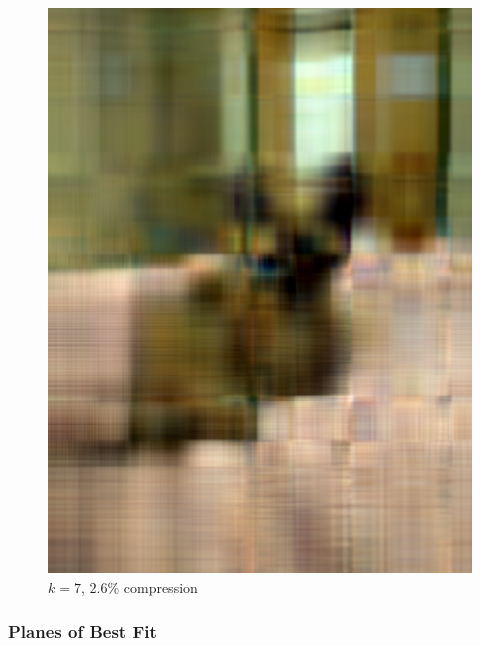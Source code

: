 \begin{figure}[H]
\begin{minipage}[b]{0.4\textwidth}
    \includegraphics[width=\textwidth]{images/compressed_cat_7.png}
    \caption{$k = 7$, $2.6\%$ compression}
  \end{minipage}
\end{figure}

\subsubsection{Planes of Best Fit}